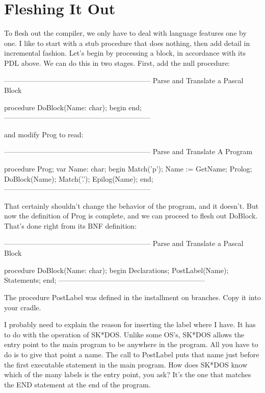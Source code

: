 \documentclass[float=false, crop=false]{standalone}
\begin{document}
\section{Fleshing It Out}

To flesh out the compiler, we only have to deal with language features one by
one. I like to start with a stub procedure that does nothing, then add detail in
incremental fashion. Let's begin by processing a block, in accordance with its
PDL above. We can do this in two stages. First, add the null procedure:

\begin{code}
{--------------------------------------------------------------}
{ Parse and Translate a Pascal Block }

procedure DoBlock(Name: char);
begin
end;
{--------------------------------------------------------------}
\end{code}

and modify Prog to read:

\begin{code}
{--------------------------------------------------------------}
{ Parse and Translate A Program }

procedure Prog;
var  Name: char;
begin
   Match('p');
   Name := GetName;
   Prolog;
   DoBlock(Name);
   Match('.');
   Epilog(Name);
end;
{--------------------------------------------------------------}
\end{code}

That certainly shouldn't change the behavior of the program, and it doesn't. But
now the definition of Prog is complete, and we can proceed to flesh out DoBlock.
That's done right from its BNF definition:

\begin{code}
{--------------------------------------------------------------}
{ Parse and Translate a Pascal Block }

procedure DoBlock(Name: char);
begin
   Declarations;
   PostLabel(Name);
   Statements;
end;
{--------------------------------------------------------------}
\end{code}

The procedure PostLabel was defined in the installment on branches. Copy it into
your cradle.

I probably need to explain the reason for inserting the label where I have. It
has to do with the operation of SK*DOS. Unlike some OS's, SK*DOS allows the
entry point to the main program to be anywhere in the program. All you have to
do is to give that point a name. The call to PostLabel puts that name just
before the first executable statement in the main program. How does SK*DOS know
which of the many labels is the entry point, you ask? It's the one that matches
the END statement at the end of the program.
\end{document}
